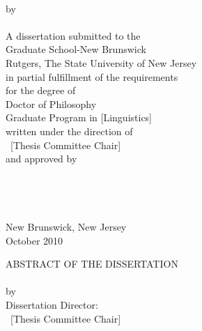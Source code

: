 \documentclass[12pt,oneside]{memoir}	%
\begin{document}
\begin{center}
\thispagestyle{empty}
\MakeUppercase{\thetitle}\\[12pt]
by\\[12pt]
\MakeUppercase{\theauthor}\\[36pt]
A dissertation submitted to the\\
Graduate School-New Brunswick\\
Rutgers, The State University of New Jersey\\
in partial fulfillment of the requirements\\
for the degree of\\
Doctor of Philosophy\\
Graduate Program in [Linguistics]\\
written under the direction of\\
~[Thesis Committee Chair] \\
and approved by\\[12pt]
\underline{\hspace{180pt}}\\[12pt]
\underline{\hspace{180pt}}\\[12pt]
\underline{\hspace{180pt}}\\[12pt]
\underline{\hspace{180pt}}\\[24pt]
New Brunswick, New Jersey\\
October 2010
\end{center}
%
\newpage
\setcounter{page}{2}
\pagestyle{plain}
\mtcaddchapter[Abstract]	%
\begin{center}	
ABSTRACT OF THE DISSERTATION\\[24pt]
{\Large\em \thetitle}\\[12pt]
by \MakeUppercase{\theauthor}\\[36pt]
Dissertation Director:\\
~[Thesis Committee Chair] 
\end{center}
\vspace{24pt}
\end{document}
